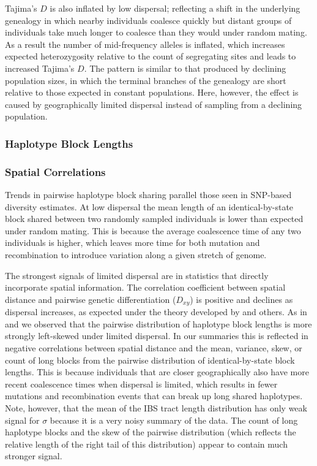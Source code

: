 \documentclass[9pt,twocolumn,twoside,lineno]{gsajnl}
\begin{document}
Tajima's $D$ is also inflated by low dispersal; reflecting a shift in the underlying genealogy in which nearby individuals coalesce quickly but distant groups of individuals take much longer to coalesce than they would under random mating. As a result the number of mid-frequency alleles is inflated, which increases expected heterozygosity relative to the count of segregating sites and leads to increased Tajima's $D$. The pattern is similar to that produced by declining population sizes, in which the terminal branches of the genealogy are short relative to those expected in constant populations. Here, however, the effect is caused by geographically limited dispersal instead of sampling from a declining population. 



\subsubsection{Haplotype Block Lengths}


\subsubsection{Spatial Correlations}

Trends in pairwise haplotype block sharing parallel those seen in SNP-based diversity estimates. At low dispersal the mean length of an identical-by-state block shared between two randomly sampled individuals is lower than expected under random mating. This is because the average coalescence time of any two individuals is higher, which leaves more time for both mutation and recombination to introduce variation along a given stretch of genome.

The strongest signals of limited dispersal are in statistics that directly incorporate spatial information. The correlation coefficient between spatial distance and pairwise genetic differentiation ($D_{xy}$) is positive and declines as dispersal increases, as expected under the theory developed by \citep{Rousset1997} and others. As in \citep{Ringbauer2017} and \citep{Baharian2016} we observed that the pairwise distribution of haplotype block lengths is more strongly left-skewed under limited dispersal. In our summaries this is reflected in negative correlations between spatial distance and the mean, variance, skew, or count of long blocks from the pairwise distribution of identical-by-state block lengths. This is because individuals that are closer geographically also have more recent coalescence times when dispersal is limited, which results in fewer mutations and recombination events that can break up long shared haplotypes. Note, however, that the mean of the IBS tract length distribution has only weak signal for $\sigma$ because it is a very noisy summary of the data. The count of long haplotype blocks and the skew of the pairwise distribution (which reflects the relative length of the right tail of this distribution) appear to contain much stronger signal. 
\end{document}

